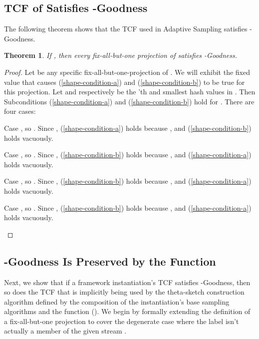\documentclass{article}
\newenvironment{tighterdescription}{\begin{description}\setlength{\itemsep}{1pt}\setlength{\parskip}{1pt}}{\end{description}}
\newtheorem{theorem}{Theorem}[section]
\begin{document}
\subsection{TCF of  Satisfies -Goodness}\label{sec:adapt-sat}
The following theorem shows that the TCF used in Adaptive Sampling satisfies -Goodness.
\begin{theorem}\label{thm:adapt-sat}
If , 
then every fix-all-but-one projection  of  satisfies -Goodness.
\end{theorem}
\begin{proof}
Let  be any specific fix-all-but-one-projection of .
We will exhibit the fixed value  that causes (\ref{shape-condition-a}) and (\ref{shape-condition-b})
to be true for this projection.
Let  and  respectively be the 'th and 
smallest hash values in . 
Then Subconditions (\ref{shape-condition-a}) and (\ref{shape-condition-b}) hold for
. There are four cases:

\begin{tighterdescription}
\item[Case ]
, so .
Since , (\ref{shape-condition-a}) holds because  ,
and (\ref{shape-condition-b}) holds vacuously.

\item[Case ]
, so .
Since , (\ref{shape-condition-b}) holds because  , 
and (\ref{shape-condition-a}) holds vacuously.

\item[Case ]
, so .
Since , (\ref{shape-condition-b}) holds because ,
and (\ref{shape-condition-a}) holds vacuously.

\item[Case ]
, so .
Since , (\ref{shape-condition-b}) holds because  ,
and (\ref{shape-condition-a}) holds vacuously.
\end{tighterdescription}
\end{proof}


\subsection{-Goodness Is Preserved by the Function }\label{sec:union-sat}
Next, we show that if a framework instantiation's TCF  satisfies -Goodness, 
then so does the TCF  that is implicitly being used by the theta-sketch construction 
algorithm defined by the composition of the instantiation's base sampling algorithms and the function ().
We begin by formally extending the definition of a fix-all-but-one projection to cover 
the degenerate case where the label  isn't actually a member of the given stream .
\end{document}
